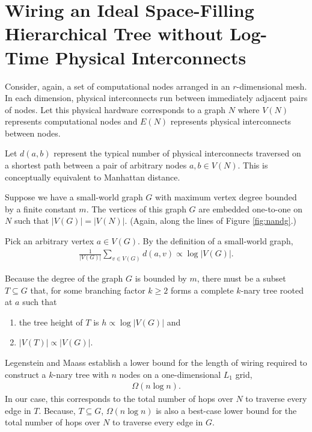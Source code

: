 \section{Wiring an Ideal Space-Filling Hierarchical Tree without Log-Time Physical Interconnects} \label{sec:proof2}

Consider, again, a set of computational nodes arranged in an $r$-dimensional mesh.
In each dimension, physical interconnects run between immediately adjacent pairs of nodes.
Let this physical hardware corresponds to a graph $N$ where $V(N)$ represents computational nodes and $E(N)$ represents physical interconnects between nodes.

Let $d(a,b)$ represent the typical number of physical interconnects traversed on a shortest path between a pair of arbitrary nodes $a, b \in V(N)$.
This is conceptually equivalent to Manhattan distance.

Suppose we have a small-world graph $G$ with maximum vertex degree bounded by a finite constant $m$.
The vertices of this graph $G$ are embedded one-to-one on $N$ such that $|V(G)| = |V(N)|$.
(Again, along the lines of Figure \ref{fig:nandg}.)


Pick an arbitrary vertex $a \in V(G)$.
By the definition of a small-world graph,
\begin{align*}
  \frac{1}{|V(G)|} \sum_{v \in V(G)} d(a, v) \propto \log |V(G)|.
\end{align*}

Because the degree of the graph $G$ is bounded by $m$, there must be a subset $T \subseteq G$ that, for some branching factor $k \geq 2$ forms a complete $k$-nary tree rooted at $a$ such that
\begin{enumerate}
  \item the tree height of $T$ is $h \propto \log |V(G)|$ and
  \item $|V(T)| \propto |V(G)|$.
\end{enumerate}

Legenstein and Maass \citep{legenstein2001optimizing} establish a lower bound for the length of wiring required to construct a $k$-nary tree with $n$ nodes on a one-dimensional $L_1$ grid,
\begin{align*}
\Omega(n \log n).
\end{align*}
In our case, this corresponds to the total number of hops over $N$ to traverse every edge in $T$.
Because, $T \subseteq G$, $\Omega(n \log n)$ is also a best-case lower bound for the total number of hops over $N$ to traverse every edge in $G$.

